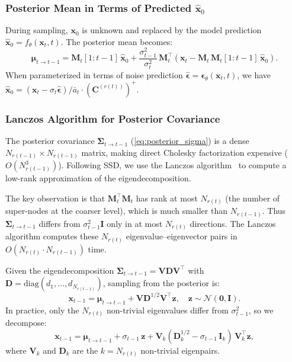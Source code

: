 \documentclass[12pt,a4paper]{article}
\newcommand{\bx}{\bm{x}}
\newcommand{\bz}{\bm{z}}
\newcommand{\bep}{\bm{\epsilon}}
\newcommand{\bmu}{\bm{\mu}}
\newcommand{\bSigma}{\bm{\Sigma}}
\newcommand{\cN}{\mathcal{N}}
\newcommand{\Mt}{\bm{M}_t}
\begin{document}
\subsubsection{Posterior Mean in Terms of Predicted $\hat{\bx}_0$}

During sampling, $\bx_0$ is unknown and replaced by the model prediction $\hat{\bx}_0 = f_\theta(\bx_t, t)$. The posterior mean becomes:
\begin{equation}\label{eq:posterior_mu_pred}
    \bmu_{t \to t-1} = \Mt[1:t-1]\, \hat{\bx}_0 + \frac{\sigma_{t-1}^2}{\sigma_t^2}\, \Mt^\top \left(\bx_t - \Mt\, \Mt[1:t-1]\, \hat{\bx}_0\right).
\end{equation}
When parameterized in terms of noise prediction $\hat{\bep} = \bep_\theta(\bx_t, t)$, we have $\hat{\bx}_0 = (\bx_t - \sigma_t \hat{\bep}) / \bar{a}_t \cdot (\bm{C}^{(r(t))})^+$.

\subsubsection{Lanczos Algorithm for Posterior Covariance}

The posterior covariance $\bSigma_{t \to t-1}$ (\cref{eq:posterior_sigma}) is a dense $N_{r(t-1)} \times N_{r(t-1)}$ matrix, making direct Cholesky factorization expensive ($O(N_{r(t-1)}^3)$). Following SSD, we use the Lanczos algorithm~\cite{lanczos1950iteration} to compute a low-rank approximation of the eigendecomposition.

The key observation is that $\Mt^\top \Mt$ has rank at most $N_{r(t)}$ (the number of super-nodes at the coarser level), which is much smaller than $N_{r(t-1)}$. Thus $\bSigma_{t \to t-1}$ differs from $\sigma_{t-1}^2 \bm{I}$ only in at most $N_{r(t)}$ directions. The Lanczos algorithm computes these $N_{r(t)}$ eigenvalue--eigenvector pairs in $O(N_{r(t)} \cdot N_{r(t-1)})$ time.

Given the eigendecomposition $\bSigma_{t \to t-1} = \bm{V} \bm{D} \bm{V}^\top$ with $\bm{D} = \mathrm{diag}(d_1, \ldots, d_{N_{r(t-1)}})$, sampling from the posterior is:
\begin{equation}\label{eq:posterior_sample}
    \bx_{t-1} = \bmu_{t \to t-1} + \bm{V} \bm{D}^{1/2} \bm{V}^\top \bz, \quad \bz \sim \cN(\bm{0}, \bm{I}).
\end{equation}
In practice, only the $N_{r(t)}$ non-trivial eigenvalues differ from $\sigma_{t-1}^2$, so we decompose:
\begin{equation}\label{eq:posterior_sample_efficient}
    \bx_{t-1} = \bmu_{t \to t-1} + \sigma_{t-1}\, \bz + \bm{V}_k (\bm{D}_k^{1/2} - \sigma_{t-1}\, \bm{I}_k)\, \bm{V}_k^\top \bz,
\end{equation}
where $\bm{V}_k$ and $\bm{D}_k$ are the $k = N_{r(t)}$ non-trivial eigenpairs.
\end{document}
